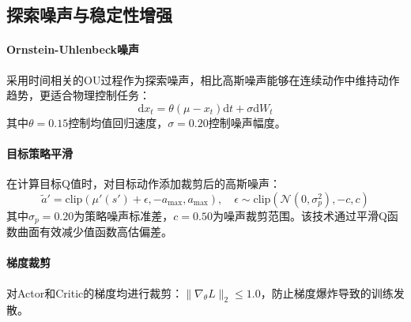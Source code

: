 \documentclass[UTF8,a4paper,12pt]{ctexart}
\begin{document}
\subsection{探索噪声与稳定性增强}

\paragraph{Ornstein-Uhlenbeck噪声}
采用时间相关的OU过程作为探索噪声，相比高斯噪声能够在连续动作中维持动作趋势，更适合物理控制任务：
\begin{equation}
\mathrm{d}x_t = \theta(\mu - x_t)\mathrm{d}t + \sigma \mathrm{d}W_t
\end{equation}
其中$\theta=0.15$控制均值回归速度，$\sigma=0.20$控制噪声幅度。

\paragraph{目标策略平滑}
在计算目标Q值时，对目标动作添加裁剪后的高斯噪声：
\begin{equation}
\tilde{a}' = \text{clip}(\mu'(s') + \epsilon, -a_{\max}, a_{\max}), \quad
\epsilon \sim \text{clip}(\mathcal{N}(0, \sigma_p^2), -c, c)
\end{equation}
其中$\sigma_p = 0.20$为策略噪声标准差，$c = 0.50$为噪声裁剪范围。该技术通过平滑Q函数曲面有效减少值函数高估偏差\cite{fujimoto2018td3}。

\paragraph{梯度裁剪}
对Actor和Critic的梯度均进行裁剪：$\|\nabla_{\theta}L\|_2 \leq 1.0$，防止梯度爆炸导致的训练发散。
\end{document}

